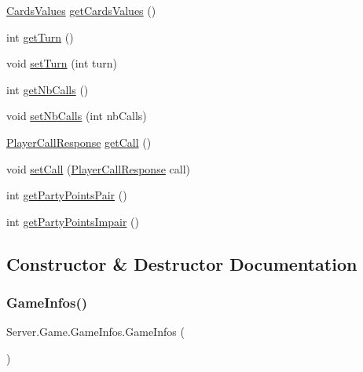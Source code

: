 \begin{DoxyCompactItemize}
\mbox{\hyperlink{classServer_1_1Game_1_1CardsValues}{Cards\+Values}} \mbox{\hyperlink{classServer_1_1Game_1_1GameInfos_a64017ae5828e67053ed81e4223335ece}{get\+Cards\+Values}} ()
\item 
int \mbox{\hyperlink{classServer_1_1Game_1_1GameInfos_ab2cc689ba180b45dfa4af4ca540d16e4}{get\+Turn}} ()
\item 
void \mbox{\hyperlink{classServer_1_1Game_1_1GameInfos_a24e034a63f163cee0e142a248edaaa91}{set\+Turn}} (int turn)
\item 
int \mbox{\hyperlink{classServer_1_1Game_1_1GameInfos_af42e8e12df8eff0f8cab3146d7074b50}{get\+Nb\+Calls}} ()
\item 
void \mbox{\hyperlink{classServer_1_1Game_1_1GameInfos_a064a7d99fce54d2a28eb8be38ca3e76a}{set\+Nb\+Calls}} (int nb\+Calls)
\item 
\mbox{\hyperlink{classCommon_1_1PlayerCallResponse}{Player\+Call\+Response}} \mbox{\hyperlink{classServer_1_1Game_1_1GameInfos_a8673ae8706fbba6f916f926669ad940c}{get\+Call}} ()
\item 
void \mbox{\hyperlink{classServer_1_1Game_1_1GameInfos_a6903057180e23ab4773aba9a23af6a31}{set\+Call}} (\mbox{\hyperlink{classCommon_1_1PlayerCallResponse}{Player\+Call\+Response}} call)
\item 
int \mbox{\hyperlink{classServer_1_1Game_1_1GameInfos_a2ec1240ba837887742202b6ced951bd1}{get\+Party\+Points\+Pair}} ()
\item 
int \mbox{\hyperlink{classServer_1_1Game_1_1GameInfos_ae4d2b28efa6f18431a18c68b12f6a3e5}{get\+Party\+Points\+Impair}} ()
\end{DoxyCompactItemize}


\subsection{Constructor \& Destructor Documentation}
\mbox{\label{classServer_1_1Game_1_1GameInfos_a548b3ab8fe42f46062df51f915583b2f}} 
\subsubsection{\texorpdfstring{Game\+Infos()}{GameInfos()}}
{\footnotesize\ttfamily Server.\+Game.\+Game\+Infos.\+Game\+Infos (\begin{DoxyParamCaption}{ }\end{DoxyParamCaption})\hspace{0.3cm}{\ttfamily [inline]}}



